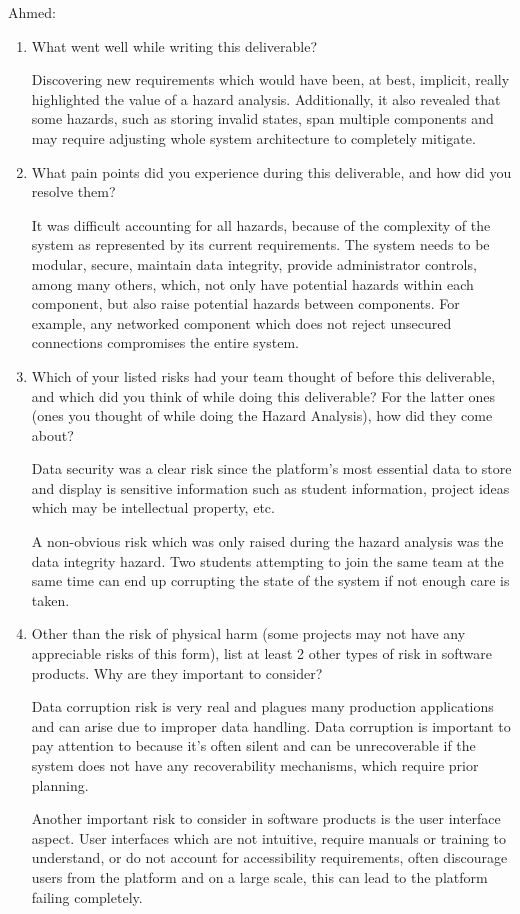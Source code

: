 \documentclass{article}
\begin{document}
Ahmed:
\begin{enumerate}
    \item What went well while writing this deliverable?

    Discovering new requirements which would have been, at best, implicit, really highlighted the value of a hazard analysis. Additionally, it also revealed that some hazards, such as storing invalid states, span multiple components and may require adjusting whole system architecture to completely mitigate.

    \item What pain points did you experience during this deliverable, and how
    did you resolve them?

    It was difficult accounting for all hazards, because of the complexity of the system as represented by its current requirements. The system needs to be modular, secure, maintain data integrity, provide administrator controls, among many others, which, not only have potential hazards within each component, but also raise potential hazards between components. For example, any networked component which does not reject unsecured connections compromises the entire system.

    \item Which of your listed risks had your team thought of before this
    deliverable, and which did you think of while doing this deliverable? For
    the latter ones (ones you thought of while doing the Hazard Analysis), how
    did they come about?

    Data security was a clear risk since the platform's most essential data to store and display is sensitive information such as student information, project ideas which may be intellectual property, etc.
    
    A non-obvious risk which was only raised during the hazard analysis was the data integrity hazard. Two students attempting to join the same team at the same time can end up corrupting the state of the system if not enough care is taken.

    \item Other than the risk of physical harm (some projects may not have any
    appreciable risks of this form), list at least 2 other types of risk in
    software products. Why are they important to consider?

    Data corruption risk is very real and plagues many production applications and can arise due to improper data handling. Data corruption is important to pay attention to because it's often silent and can be unrecoverable if the system does not have any recoverability mechanisms, which require prior planning.

    Another important risk to consider in software products is the user interface aspect. User interfaces which are not intuitive, require manuals or training to understand, or do not account for accessibility requirements, often discourage users from the platform and on a large scale, this can lead to the platform failing completely.

\end{enumerate}
\end{document}
